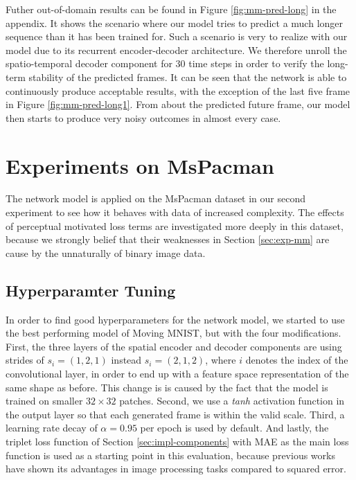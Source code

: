 Futher out-of-domain results can be found in Figure \ref{fig:mm-pred-long} in the appendix. It shows the scenario where our model tries to predict a much longer sequence than it has been trained for. Such a scenario is very to realize with our model due to its recurrent encoder-decoder architecture. We therefore unroll the spatio-temporal decoder component for \num{30} time steps in order to verify the long-term stability of the predicted frames. It can be seen that the network is able to continuously produce acceptable results, with the exception of the last five frame in Figure \ref{fig:mm-pred-long1}. From about the  predicted future frame, our model then starts to produce very noisy outcomes in almost every case.






























\section{Experiments on MsPacman} \label{sec:exp-pac}

The network model is applied on the MsPacman dataset in our second experiment to see how it behaves with data of increased complexity. The effects of perceptual motivated loss terms are investigated more deeply in this dataset, because we strongly belief that their weaknesses in Section \ref{sec:exp-mm} are cause by the unnaturally of binary image data.


\subsection{Hyperparamter Tuning}

In order to find good hyperparameters for the network model, we started to use the best performing model of Moving MNIST, but with the four modifications. First, the three layers of the spatial encoder and decoder components are using strides of $s_i=(1, 2, 1)$ instead $s_i=(2, 1, 2)$, where $i$ denotes the index of the convolutional layer, in order to end up with a feature space representation of the same shape as before. This change is is caused by the fact that the model is trained on smaller $32 \times 32$ patches. Second, we use a \textit{tanh} activation function in the output layer so that each generated frame is within the valid scale. Third, a learning rate decay of $\alpha=0.95$ per epoch is used by default. And lastly, the triplet loss function of Section \ref{sec:impl-components} with MAE as the main loss function is used as a starting point in this evaluation, because previous works have shown its advantages in image processing tasks compared to squared error.

